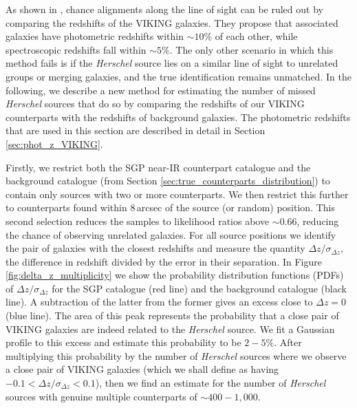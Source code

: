 As shown in \citealt{Fleuren_2012}, chance alignments along the line of sight can be ruled out by comparing the redshifts of the VIKING galaxies. They propose that associated galaxies have photometric redshifts within $\sim 10\%$ of each other, while spectroscopic redshifts fall within $\sim 5\%$. The only other scenario in which this method fails is if the \textit{Herschel} source lies on a similar line of sight to unrelated groups or merging galaxies, and the true identification remains unmatched. In the following, we describe a new method for estimating the number of missed \textit{Herschel} sources that do so by comparing the redshifts of our VIKING counterparts with the redshifts of background galaxies. The photometric redshifts that are used in this section are described in detail in Section \ref{sec:phot_z_VIKING}.

Firstly, we restrict both the SGP near-IR counterpart catalogue and the background catalogue (from Section \ref{sec:true_counterparts_distribution}) to contain only sources with two or more counterparts. We then restrict this further to counterparts found within $8\,$arcsec of the source (or random) position. This second selection reduces the samples to likelihood ratios above $\sim 0.66$, reducing the chance of observing unrelated galaxies. For all source positions we identify the pair of galaxies with the closest redshifts and measure the quantity $\Delta z/\sigma_{\Delta z}$, the difference in redshift divided by the error in their separation. In Figure \ref{fig:delta_z_multiplicity} we show the probability distribution functions (PDFs) of $\Delta z/\sigma_{\Delta z}$ for the SGP catalogue (red line) and the background catalogue (black line). A subtraction of the latter from the former gives an excess close to $\Delta z = 0$ (blue line). The area of this peak represents the probability that a close pair of VIKING galaxies are indeed related to the \textit{Herschel} source. We fit a Gaussian profile to this excess and estimate this probability to be $2 - 5\%$. After multiplying this probability by the number of \textit{Herschel} sources where we observe a close pair of VIKING galaxies (which we shall define as having $-0.1 < \Delta z/\sigma_{\Delta z} < 0.1$), then we find an estimate for the number of \textit{Herschel} sources with genuine multiple counterparts of $\sim 400 - 1,000$.

